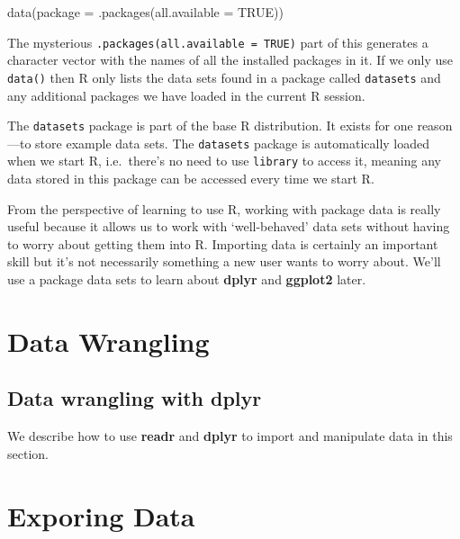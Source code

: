 \documentclass[
]{book}
\newenvironment{Shaded}{\begin{snugshade}}{\end{snugshade}}
\newcommand{\AttributeTok}[1]{\textcolor[rgb]{0.77,0.63,0.00}{#1}}
\newcommand{\ConstantTok}[1]{\textcolor[rgb]{0.00,0.00,0.00}{#1}}
\newcommand{\FunctionTok}[1]{\textcolor[rgb]{0.00,0.00,0.00}{#1}}
\newcommand{\NormalTok}[1]{#1}
\begin{document}
\begin{Shaded}
\begin{Highlighting}[]
\FunctionTok{data}\NormalTok{(}\AttributeTok{package =} \FunctionTok{.packages}\NormalTok{(}\AttributeTok{all.available =} \ConstantTok{TRUE}\NormalTok{))}
\end{Highlighting}
\end{Shaded}

The mysterious \texttt{.packages(all.available\ =\ TRUE)} part of this generates a character vector with the names of all the installed packages in it. If we only use \texttt{data()} then R only lists the data sets found in a package called \texttt{datasets} and any additional packages we have loaded in the current R session.

The \texttt{datasets} package is part of the base R distribution. It exists for one reason---to store example data sets. The \texttt{datasets} package is automatically loaded when we start R, i.e.~there's no need to use \texttt{library} to access it, meaning any data stored in this package can be accessed every time we start R.

From the perspective of learning to use R, working with package data is really useful because it allows us to work with `well-behaved' data sets without having to worry about getting them into R. Importing data is certainly an important skill but it's not necessarily something a new user wants to worry about. We'll use a package data sets to learn about \textbf{dplyr} and \textbf{ggplot2} later.

\hypertarget{part-data-wrangling}{%
\part{Data Wrangling}\label{part-data-wrangling}}

\hypertarget{data-wrangling-with-dplyr}{%
\chapter{\texorpdfstring{Data wrangling with \textbf{dplyr}}{Data wrangling with dplyr}}\label{data-wrangling-with-dplyr}}

We describe how to use \textbf{readr} and \textbf{dplyr} to import and manipulate data in this section.

\hypertarget{part-exporing-data}{%
\part{Exporing Data}\label{part-exporing-data}}
\end{document}
